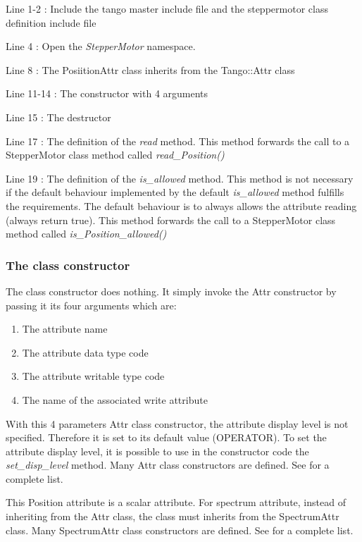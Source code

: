 

Line 1-2 : Include the tango master include file and the steppermotor
class definition include file

Line 4 : Open the \emph{StepperMotor} namespace.

Line 8 : The PosiitionAttr class inherits from the Tango::Attr class

Line 11-14 : The constructor with 4 arguments

Line 15 : The destructor

Line 17 : The definition of the \emph{read} method. This method forwards
the call to a StepperMotor class method called \emph{read\_Position()}

Line 19 : The definition of the \emph{is\_allowed}
method. This method is not necessary if the default behaviour implemented
by the default \emph{is\_allowed} method fulfills the requirements.
The default behaviour is to always allows the attribute reading (always
return true). This method forwards the call to a StepperMotor class
method called \emph{is\_Position\_allowed()}


\subsubsection{The class constructor}

The class constructor does nothing. It simply invoke the Attr
constructor by passing it its four arguments which are:
\begin{enumerate}
\item The attribute name
\item The attribute data type code
\item The attribute writable type code
\item The name of the associated write attribute
\end{enumerate}
With this 4 parameters Attr class constructor, the attribute display
level is not specified. Therefore it is set to its default value (OPERATOR).
To set the attribute display level, it is possible to use in the constructor
code the \emph{set\_disp\_level} method. Many
Attr class constructors are defined. See \cite{TANGO_ref_man}for
a complete list.

This Position attribute is a scalar attribute. For spectrum attribute,
instead of inheriting from the Attr class, the class must inherits
from the SpectrumAttr class. Many SpectrumAttr
class constructors are defined. See \cite{TANGO_ref_man}for a complete
list.

